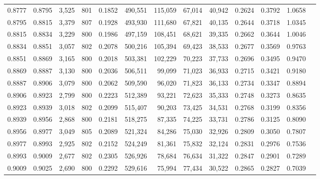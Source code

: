 \begin{tabular}{rrrrrrrrrrrrr}
0.8777 & 0.8795 &  3,525 & 801 &                                     0.1852 & 490,551 & 115,059 &  67,014 &  40,942 & 0.2624 & 0.3792 & 1.0658 \\
0.8795 & 0.8815 &  3,379 & 807 &                                     0.1928 & 493,930 & 111,680 &  67,821 &  40,135 & 0.2644 & 0.3718 & 1.0345 \\
0.8815 & 0.8834 &  3,229 & 800 &                                     0.1986 & 497,159 & 108,451 &  68,621 &  39,335 & 0.2662 & 0.3644 & 1.0046 \\
0.8834 & 0.8851 &  3,057 & 802 &                                     0.2078 & 500,216 & 105,394 &  69,423 &  38,533 & 0.2677 & 0.3569 & 0.9763 \\
0.8851 & 0.8869 &  3,165 & 800 &                                     0.2018 & 503,381 & 102,229 &  70,223 &  37,733 & 0.2696 & 0.3495 & 0.9470 \\
0.8869 & 0.8887 &  3,130 & 800 &                                     0.2036 & 506,511 &  99,099 &  71,023 &  36,933 & 0.2715 & 0.3421 & 0.9180 \\
0.8887 & 0.8906 &  3,079 & 800 &                                     0.2062 & 509,590 &  96,020 &  71,823 &  36,133 & 0.2734 & 0.3347 & 0.8894 \\
0.8906 & 0.8923 &  2,799 & 800 &                                     0.2223 & 512,389 &  93,221 &  72,623 &  35,333 & 0.2748 & 0.3273 & 0.8635 \\
0.8923 & 0.8939 &  3,018 & 802 &                                     0.2099 & 515,407 &  90,203 &  73,425 &  34,531 & 0.2768 & 0.3199 & 0.8356 \\
0.8939 & 0.8956 &  2,868 & 800 &                                     0.2181 & 518,275 &  87,335 &  74,225 &  33,731 & 0.2786 & 0.3125 & 0.8090 \\
0.8956 & 0.8977 &  3,049 & 805 &                                     0.2089 & 521,324 &  84,286 &  75,030 &  32,926 & 0.2809 & 0.3050 & 0.7807 \\
0.8977 & 0.8993 &  2,925 & 802 &                                     0.2152 & 524,249 &  81,361 &  75,832 &  32,124 & 0.2831 & 0.2976 & 0.7536 \\
0.8993 & 0.9009 &  2,677 & 802 &                                     0.2305 & 526,926 &  78,684 &  76,634 &  31,322 & 0.2847 & 0.2901 & 0.7289 \\
0.9009 & 0.9025 &  2,690 & 800 &                                     0.2292 & 529,616 &  75,994 &  77,434 &  30,522 & 0.2865 & 0.2827 & 0.7039 \\

\end{tabular}
